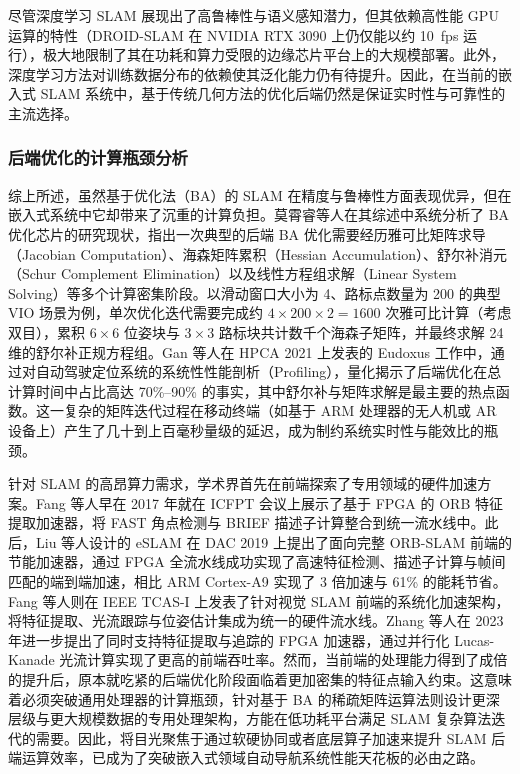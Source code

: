 尽管深度学习 SLAM 展现出了高鲁棒性与语义感知潜力，但其依赖高性能 GPU 运算的特性（DROID-SLAM 在 NVIDIA RTX 3090 上仍仅能以约 10~fps 运行），极大地限制了其在功耗和算力受限的边缘芯片平台上的大规模部署。此外，深度学习方法对训练数据分布的依赖使其泛化能力仍有待提升。因此，在当前的嵌入式 SLAM 系统中，基于传统几何方法的优化后端仍然是保证实时性与可靠性的主流选择。

\subsubsection{后端优化的计算瓶颈分析}

综上所述，虽然基于优化法（BA）的 SLAM 在精度与鲁棒性方面表现优异，但在嵌入式系统中它却带来了沉重的计算负担。莫霄睿等人\cite{mo2024ba_review}在其综述中系统分析了 BA 优化芯片的研究现状，指出一次典型的后端 BA 优化需要经历雅可比矩阵求导（Jacobian Computation）、海森矩阵累积（Hessian Accumulation）、舒尔补消元（Schur Complement Elimination）以及线性方程组求解（Linear System Solving）等多个计算密集阶段。以滑动窗口大小为 4、路标点数量为 200 的典型 VIO 场景为例，单次优化迭代需要完成约 $4 \times 200 \times 2 = 1600$ 次雅可比计算（考虑双目），累积 $6 \times 6$ 位姿块与 $3 \times 3$ 路标块共计数千个海森子矩阵，并最终求解 24 维的舒尔补正规方程组。Gan 等人\cite{gan2021eudoxus}在 HPCA 2021 上发表的 Eudoxus 工作中，通过对自动驾驶定位系统的系统性性能剖析（Profiling），量化揭示了后端优化在总计算时间中占比高达 70\%--90\% 的事实，其中舒尔补与矩阵求解是最主要的热点函数。这一复杂的矩阵迭代过程在移动终端（如基于 ARM 处理器的无人机或 AR 设备上）产生了几十到上百毫秒量级的延迟，成为制约系统实时性与能效比的瓶颈。

针对 SLAM 的高昂算力需求，学术界首先在前端探索了专用领域的硬件加速方案。Fang 等人\cite{fang2017fpga_orb}早在 2017 年就在 ICFPT 会议上展示了基于 FPGA 的 ORB 特征提取加速器，将 FAST 角点检测与 BRIEF 描述子计算整合到统一流水线中。此后，Liu 等人设计的 eSLAM\cite{liu2019eslam} 在 DAC 2019 上提出了面向完整 ORB-SLAM 前端的节能加速器，通过 FPGA 全流水线成功实现了高速特征检测、描述子计算与帧间匹配的端到端加速，相比 ARM Cortex-A9 实现了 3 倍加速与 61\% 的能耗节省。Fang 等人\cite{fang2019fpga}则在 IEEE TCAS-I 上发表了针对视觉 SLAM 前端的系统化加速架构，将特征提取、光流跟踪与位姿估计集成为统一的硬件流水线。Zhang 等人\cite{zhang2023fpga_feature}在 2023 年进一步提出了同时支持特征提取与追踪的 FPGA 加速器，通过并行化 Lucas-Kanade 光流计算实现了更高的前端吞吐率。然而，当前端的处理能力得到了成倍的提升后，原本就吃紧的后端优化阶段面临着更加密集的特征点输入约束。这意味着必须突破通用处理器的计算瓶颈，针对基于 BA 的稀疏矩阵运算法则设计更深层级与更大规模数据的专用处理架构，方能在低功耗平台满足 SLAM 复杂算法迭代的需要。因此，将目光聚焦于通过软硬协同或者底层算子加速来提升 SLAM 后端运算效率，已成为了突破嵌入式领域自动导航系统性能天花板的必由之路。

